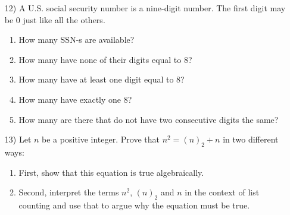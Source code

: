 \documentclass[11pt]{preprint}
\begin{document}
\begin{enumerate}

\item[12)] A U.S. social security number is a nine-digit number. The first digit may be $0$ just like all the others.
\begin{enumerate}
\item How many SSN-s are available?
\item How many have none of their digits equal to $8$?
\item How many have at least one digit equal to $8$?
\item How many have exactly one $8$?
\item How many are there that do not have two consecutive digits the same?
\end{enumerate}

\item[13)] Let $n$ be a positive integer. Prove that $n^2=(n)_2+n$ in two different ways:
\begin{enumerate}
\item First, show that this equation is true algebraically.
\item Second, interpret the terms $n^2$, $(n)_2$ and $n$ in the context of list counting and use that to argue why the equation must be true.
\end{enumerate}
\end{enumerate}
\end{document}
